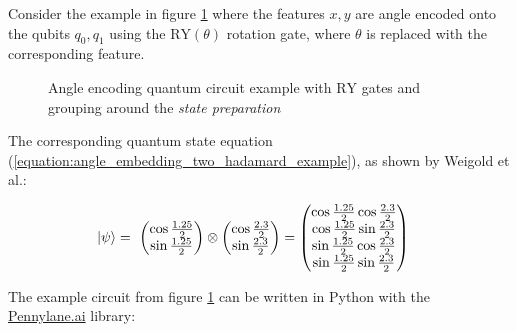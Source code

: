Consider the example in figure \ref{fig:example_encoding_circuit_ry} where the features $x, y$ are angle encoded onto the qubits $q_0, q_1$ using the $\mathrm{RY}(\theta)$ rotation gate, where $\theta$ is replaced with the corresponding feature. 

\begin{figure}[!h]
    \centering
    \caption{Angle encoding quantum circuit example with $\mathrm{RY}$ gates and grouping around the \textit{state preparation}}
    \label{fig:example_encoding_circuit_ry}
\end{figure}

The corresponding quantum state equation (\ref{equation:angle_embedding_two_hadamard_example}), as shown by Weigold et al.\cite{Weigold2021_ExpandingDataEncodingPatterns}:

\begin{equation}
    \centering
    \begin{split}
        \ket{\psi} &=\ \begin{pmatrix}\cos{\frac{1.25}{2}} \\ \sin{\frac{1.25}{2}}\end{pmatrix} \otimes \begin{pmatrix}\cos{\frac{2.3}{2}} \\ \sin{\frac{2.3}{2}}\end{pmatrix} = \begin{pmatrix}
            \cos{\frac{1.25}{2}}\cos{\frac{2.3}{2}}\\
            \cos{\frac{1.25}{2}}\sin{\frac{2.3}{2}}\\
            \sin{\frac{1.25}{2}}\cos{\frac{2.3}{2}}\\
            \sin{\frac{1.25}{2}}\sin{\frac{2.3}{2}}
        \end{pmatrix}
    \end{split}
    \label{equation:angle_embedding_two_hadamard_example}
\end{equation}

\par
\noindent The example circuit from figure \ref{fig:example_encoding_circuit_ry} can be written in Python with the \href{https://www.pennylane.ai}{Pennylane.ai} library:

